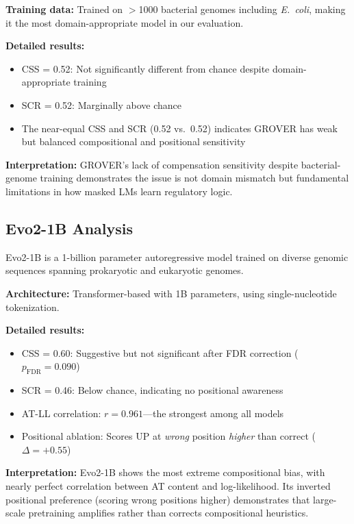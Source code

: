 \documentclass{article}
\begin{document}
\textbf{Training data:} Trained on $>$1000 bacterial genomes including \textit{E.\ coli}, making it the most domain-appropriate model in our evaluation.

\textbf{Detailed results:}
\begin{itemize}
\item CSS = 0.52: Not significantly different from chance despite domain-appropriate training
\item SCR = 0.52: Marginally above chance
\item The near-equal CSS and SCR (0.52 vs.\ 0.52) indicates GROVER has weak but balanced compositional and positional sensitivity
\end{itemize}

\textbf{Interpretation:} GROVER's lack of compensation sensitivity despite bacterial-genome training demonstrates the issue is not domain mismatch but fundamental limitations in how masked LMs learn regulatory logic.

\subsection{Evo2-1B Analysis}

Evo2-1B is a 1-billion parameter autoregressive model trained on diverse genomic sequences spanning prokaryotic and eukaryotic genomes.

\textbf{Architecture:} Transformer-based with 1B parameters, using single-nucleotide tokenization.

\textbf{Detailed results:}
\begin{itemize}
\item CSS = 0.60: Suggestive but not significant after FDR correction ($p_{\text{FDR}} = 0.090$)
\item SCR = 0.46: Below chance, indicating no positional awareness
\item AT-LL correlation: $r = 0.961$---the strongest among all models
\item Positional ablation: Scores UP at \textit{wrong} position \textit{higher} than correct ($\Delta = +0.55$)
\end{itemize}

\textbf{Interpretation:} Evo2-1B shows the most extreme compositional bias, with nearly perfect correlation between AT content and log-likelihood. Its inverted positional preference (scoring wrong positions higher) demonstrates that large-scale pretraining amplifies rather than corrects compositional heuristics.
\end{document}
